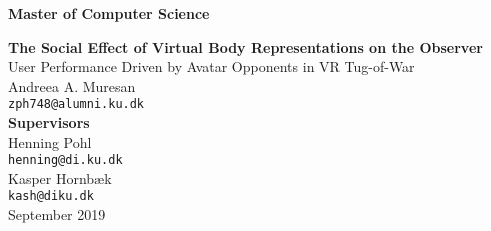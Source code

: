 \documentclass[12pt,a4paper,oneside]{article}
\begin{document}
    \thispagestyle{empty}
 
    \vspace*{-1cm}
    \begin{center}
        \textbf{\Large Master of Computer Science} \\
    \end{center}
    \vspace*{5cm} 
    \begin{center}
    \textbf{\Huge The Social Effect of Virtual Body Representations on the
Observer} \\
    \vspace*{1cm} 
    {\Large User Performance Driven by Avatar Opponents in VR Tug-of-War} \\
      \vspace*{1cm} 
    Andreea A. Muresan \\
    \texttt{zph748@alumni.ku.dk} \\
     \vspace*{1cm} 
    \textbf{\large Supervisors} \\
         \vspace*{0.2cm} 
    Henning Pohl  \\
    \texttt{henning@di.ku.dk} \\
         \vspace*{0.2cm} 
    Kasper Hornbæk \\
    \texttt{kash@diku.dk} \\
       \vspace*{1cm} 
   September 2019
   
 \end{center}
\newpage
\ClearWallPaper

\tableofcontents
{}
\newpage
\ClearWallPaper













\medskip



\end{document}
